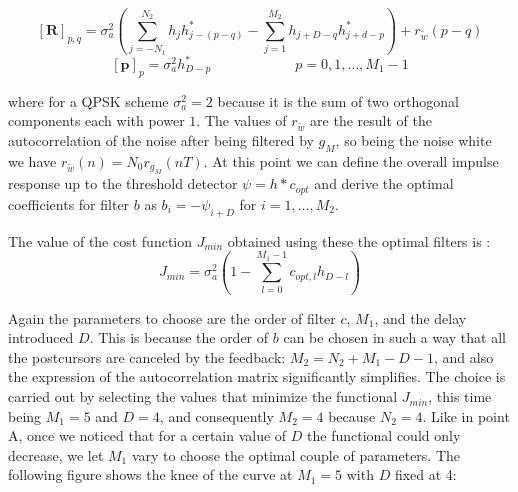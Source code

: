 \documentclass[a4paper,11.5pt]{article}
\begin{document}
\begin{equation} \label{eq:wienerR}
\mathbf{[R]}_{p,q} = \sigma_a^2 \left( \sum_{j=-N_1}^{N_2}h_jh^*_{j-(p-q)}-\sum_{j=1}^{M_2}h_{j+D-q}h^*_{j+d-p} \right) + r_{\tilde{w}}(p-q)
\end{equation}
\begin{equation} \label{eq:wienerp}
\mathbf{[p]}_p = \sigma_a^2 h^*_{D-p} \quad\quad\quad\quad\quad\quad p = 0,1,\dots,M_1-1
\end{equation}

where for a QPSK scheme $\sigma_a^2=2$ because it is the sum of two orthogonal components each with power $1$. The values of $r_{\tilde{w}}$ are the result of the autocorrelation of the noise after being filtered by $g_M$, so being the noise white we have $r_{\tilde{w}}(n)=N_0r_{g_M}(nT)$. At this point we can define the overall impulse response up to the threshold detector $\psi = h*c_{opt}$ and derive the optimal coefficients for filter $b$ as $b_i=-\psi_{i+D}$ for $i=1,\dots,M_2$.

The value of the cost function $J_{min}$ obtained using these the optimal filters is :
\begin{equation} \label{eq:jmin}
J_{min} = \sigma^2_a \left( 1-\sum_{l=0}^{M_1-1} c_{opt,l}h_{D-l}\right)
\end{equation}

Again the parameters to choose are the order of filter $c$, $M_1$, and the delay introduced $D$. This is because the order of $b$ can be chosen in such a way that all the postcursors are canceled by the feedback: $M_2=N_2+M_1-D-1$, and also the expression of the autocorrelation matrix significantly simplifies. The choice is carried out by selecting the values that minimize the functional $J_{min}$, this time being $M_1=5$ and $D=4$, and consequently $M_2=4$ because $N_2=4$. Like in point A, once we noticed that for a certain value of $D$ the functional could only decrease, we let $M_1$ vary to choose the optimal couple of parameters. The following figure shows the knee of the curve at $M_1=5$ with $D$ fixed at 4:
\end{document}
